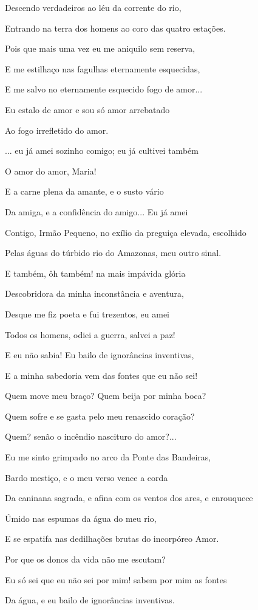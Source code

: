 Descendo verdadeiros ao léu da corrente do rio,

Entrando na terra dos homens ao coro das quatro estações.

Pois que mais uma vez eu me aniquilo sem reserva,

E me estilhaço nas fagulhas eternamente esquecidas,

E me salvo no eternamente esquecido fogo de amor...

Eu estalo de amor e sou só amor arrebatado

Ao fogo irrefletido do amor.

... eu já amei sozinho comigo; eu já cultivei também

O amor do amor, Maria!

E a carne plena da amante, e o susto vário

Da amiga, e a confidência do amigo... Eu já amei

Contigo, Irmão Pequeno, no exílio da preguiça elevada, escolhido

Pelas águas do túrbido rio do Amazonas, meu outro sinal.

E também, ôh também! na mais impávida glória

Descobridora da minha inconstância e aventura,

Desque me fiz poeta e fui trezentos, eu amei

Todos os homens, odiei a guerra, salvei a paz!

E eu não sabia! Eu bailo de ignorâncias inventivas,

E a minha sabedoria vem das fontes que eu não sei!

Quem move meu braço? Quem beija por minha boca?

Quem sofre e se gasta pelo meu renascido coração?

Quem? senão o incêndio nascituro do amor?...

Eu me sinto grimpado no arco da Ponte das Bandeiras,

Bardo mestiço, e o meu verso vence a corda

Da caninana sagrada, e afina com os ventos dos ares, e enrouquece

Úmido nas espumas da água do meu rio,

E se espatifa nas dedilhações brutas do incorpóreo Amor.

Por que os donos da vida não me escutam?

Eu só sei que eu não sei por mim! sabem por mim as fontes

Da água, e eu bailo de ignorâncias inventivas.

